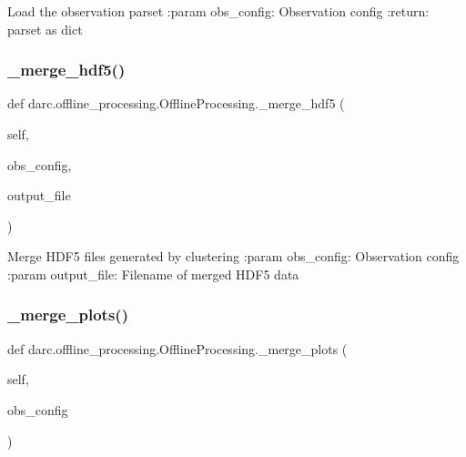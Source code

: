 \begin{DoxyVerb}Load the observation parset
:param obs_config: Observation config
:return: parset as dict
\end{DoxyVerb}
 \mbox{\label{classdarc_1_1offline__processing_1_1_offline_processing_a3267c51a62c3022f47423d374833571e}} 
\subsubsection{\texorpdfstring{\_merge\_hdf5()}{\_merge\_hdf5()}}
{\footnotesize\ttfamily def darc.\+offline\+\_\+processing.\+Offline\+Processing.\+\_\+merge\+\_\+hdf5 (\begin{DoxyParamCaption}\item[{}]{self,  }\item[{}]{obs\+\_\+config,  }\item[{}]{output\+\_\+file }\end{DoxyParamCaption})\hspace{0.3cm}{\ttfamily [private]}}

\begin{DoxyVerb}Merge HDF5 files generated by clustering
:param obs_config: Observation config
:param output_file: Filename of merged HDF5 data
\end{DoxyVerb}
 \mbox{\label{classdarc_1_1offline__processing_1_1_offline_processing_ac1e6e317518b89b7f8475a5f7e002be1}} 
\subsubsection{\texorpdfstring{\_merge\_plots()}{\_merge\_plots()}}
{\footnotesize\ttfamily def darc.\+offline\+\_\+processing.\+Offline\+Processing.\+\_\+merge\+\_\+plots (\begin{DoxyParamCaption}\item[{}]{self,  }\item[{}]{obs\+\_\+config }\end{DoxyParamCaption})\hspace{0.3cm}{\ttfamily [private]}}

